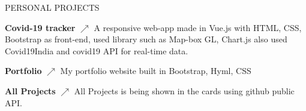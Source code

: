 \documentclass{resume} %
\begin{document}
\begin{rSection}{PERSONAL PROJECTS}
 
\item \textbf{Covid-19 tracker} 
\href{https://covid19status.vercel.app/}{\texorpdfstring{\(\nearrow\)}{nearrow}}
{A responsive web-app made in Vue.js with HTML, CSS, Bootstrap as front-end, used library such as Map-box GL,
			Chart.js also used Covid19India and covid19 API for real-time
			data.}


\item \textbf{Portfolio}
\href{https://portfolio.kashif.world/}{\texorpdfstring{\(\nearrow\)}{nearrow}}
{My portfolio website built in Bootstrap, Hyml, CSS}



\item {\bf All Projects}
\href{https://myprojects.vercel.app/}{\texorpdfstring{\(\nearrow\)}{nearrow}}  {All Projects is being shown in the cards using github public API.}
\item 

\end{rSection}
\end{document}
